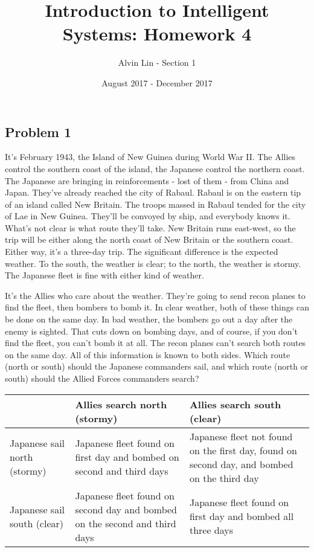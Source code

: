\documentclass{math}
\title{Introduction to Intelligent Systems: Homework 4}
\author{Alvin Lin - Section 1}
\date{August 2017 - December 2017}
\begin{document}
\maketitle

\subsection*{Problem 1}
It's February 1943, the Island of New Guinea during World War II. The Allies
control the southern coast of the island, the Japanese control the northern
coast. The Japanese are bringing in reinforcements - lost of them - from China
and Japan. They've already reached the city of Rabaul. Rabaul is on the eastern
tip of an island called New Britain. The troops massed in Rabaul tended for the
city of Lae in New Guinea. They'll be convoyed by ship, and everybody knows it.
What's not clear is what route they'll take. New Britain runs east-west, so the
trip will be either along the north coast of New Britain or the southern coast.
Either way, it's a three-day trip. The significant difference is the expected
weather. To the south, the weather is clear; to the north, the weather is
stormy. The Japanese fleet is fine with either kind of weather.
\par It's the Allies who care about the weather. They're going to send recon
planes to find the fleet, then bombers to bomb it. In clear weather, both of
these things can be done on the same day. In bad weather, the bombers go out a
day after the enemy is sighted. That cuts down on bombing days, and of course,
if you don't find the fleet, you can't bomb it at all. The recon planes can't
search both routes on the same day. All of this information is known to both
sides. Which route (north or south) should the Japanese commanders sail, and
which route (north or south) should the Allied Forces commanders search?
\begin{center}
  \begin{tabular}{|p{4cm}|p{6cm}|p{6cm}|}
    \hline
    & Allies search north (stormy) & Allies search south (clear) \\
    \hline
    Japanese sail north (stormy) &
      Japanese fleet found on first day and bombed on second and third days &
      Japanese fleet not found on the first day, found on second day, and
        bombed on the third day \\
    \hline
    Japanese sail south (clear) &
      Japanese fleet found on second day and bombed on the second and third
        days &
      Japanese fleet found on first day and bombed all three days \\
    \hline
  \end{tabular}
\end{center}
\end{document}
